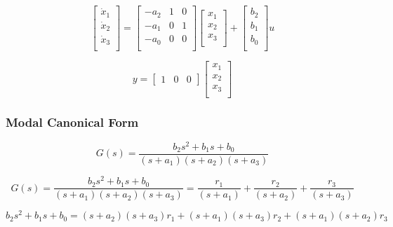 \begin{equation*}
  \begin{bmatrix}
    \dot{x}_1 \\ %
    \dot{x}_2 \\
    \dot{x}_3 \\
  \end{bmatrix}=
  \begin{bmatrix}
    -a_2 & 1 & 0 \\ %
    -a_1 & 0 & 1 \\
    -a_0 & 0 & 0 \\
  \end{bmatrix}
  \begin{bmatrix}
    x_1 \\ %
    x_2 \\
    x_3 \\
  \end{bmatrix}+
  \begin{bmatrix}
    b_2 \\ %
    b_1 \\
    b_0 \\
  \end{bmatrix}u
\end{equation*}

\begin{equation*}
  y=
  \begin{bmatrix}
    1 & 0 & 0
  \end{bmatrix}
  \begin{bmatrix}
    x_1 \\ %
    x_2 \\
    x_3 \\
  \end{bmatrix}
\end{equation*}

\subsubsection{Modal Canonical Form}

\begin{equation*}
  G(s)=\frac{b_2s^2+b_1s+b_0}{(s+a_1)(s+a_2)(s+a_3)}
\end{equation*}

\begin{equation*}
  G(s)=\frac{b_2s^2+b_1s+b_0}{(s+a_1)(s+a_2)(s+a_3)}=\frac{r_1}{(s+a_1)}+\frac{r_2}{(s+a_2)}+\frac{r_3}{(s+a_3)}
\end{equation*}

\begin{equation*}
  b_2s^2+b_1s+b_0=(s+a_2)(s+a_3)r_1+(s+a_1)(s+a_3)r_2+(s+a_1)(s+a_2)r_3
\end{equation*}

